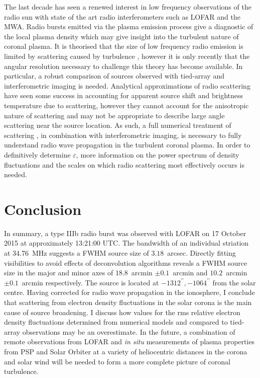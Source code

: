 The last decade has seen a renewed interest in low frequency observations of the radio sun with state of the art radio interferometers such as LOFAR and the MWA. Radio bursts emitted via the plasma emission process give a diagnostic of the local plasma density which may give insight into the turbulent nature of coronal plasma. It is theorised that the size of low frequency radio emission is limited by scattering caused by turbulence \citep{Bastian1994}, however it is only recently that the angular resolution necessary to challenge this theory has become available. In particular, a robust comparison of sources observed with tied-array and interferometric imaging is needed. Analytical approximations of radio scattering \citep[e.g.][]{Chrysaphi2018,Gordovskyy2019,Sharma2020} have seen some success in accounting for apparent source shift and brightness temperature due to scattering, however they cannot account for the anisotropic nature of scattering and may not be appropriate to describe large angle scattering near the source location. As such, a full numerical treatment of scattering \citep[e.g.][]{Thejappa2008, Bian2019, Kontar2019}, in combination with interferometric imaging, is necessary to fully understand radio wave propagation in the turbulent coronal plasma. In order to definitively determine $\varepsilon$, more information on the power spectrum of density fluctuations and the scales on which radio scattering most effectively occurs is needed.

\section{Conclusion}
In summary, a type IIIb radio burst was observed with LOFAR on 17 October 2015 at approximately 13:21:00 UTC. The bandwidth of an individual striation at 34.76~MHz suggests a FWHM source size of $3.18$~arcsec. Directly fitting visibilities to avoid effects of deconvolution algorithms reveals a FWHM source size in the major and minor axes of $18.8$~arcmin $\pm 0.1$~arcmin and $10.2$~arcmin $\pm 0.1$~arcmin respectively. The source is located at $-1312^{\prime\prime}, -1064^{\prime\prime}$ from the solar centre. 
Having corrected for radio wave propagation in the ionosphere, I conclude that scattering from electron density fluctuations in the solar corona is the main cause of source broadening. I discuss how values for the rms relative electron density fluctuations determined from numerical models and compared to tied-array observations may be an overestimate. 
In the future, a combination of remote observations from LOFAR and \textit{in situ} measurements of plasma properties from PSP and Solar Orbiter \citep{Muller2013,Muller2020} at a variety of heliocentric distances in the corona and solar wind will be needed to form a more complete picture of coronal turbulence.
